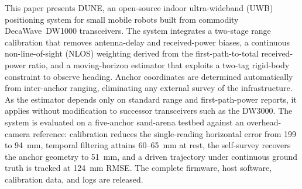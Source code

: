 This paper presents DUNE, an open-source indoor ultra-wideband (UWB)
positioning system for small mobile robots built from commodity
DecaWave~DW1000 transceivers. The system integrates a two-stage range
calibration that removes antenna-delay and received-power biases, a
continuous non-line-of-sight (NLOS) weighting derived from the
first-path-to-total received-power ratio, and a moving-horizon estimator
that exploits a two-tag rigid-body constraint to observe heading. Anchor
coordinates are determined automatically from inter-anchor ranging,
eliminating any external survey of the infrastructure. As the estimator
depends only on standard range and first-path-power reports, it applies
without modification to successor transceivers such as the DW3000. The
system is evaluated on a five-anchor sand-arena testbed against an
overhead-camera reference: calibration reduces the single-reading
horizontal error from \SI{199}{} to \SI{94}{\milli\meter}, temporal
filtering attains \SI{60}{}--\SI{65}{\milli\meter} at rest, the
self-survey recovers the anchor geometry to \SI{51}{\milli\meter}, and a
driven trajectory under continuous ground truth is tracked at
\SI{124}{\milli\meter} RMSE. The complete firmware, host software,
calibration data, and logs are released.
